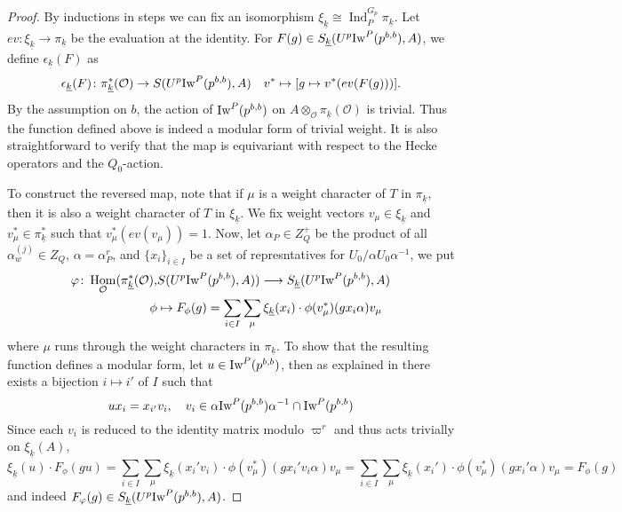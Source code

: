 \documentclass[leqno]{amsart}
\theoremstyle{definition}
\theoremstyle{remark}
\newcommand{\oo}{\mathcal{O}}
\DeclareMathOperator{\Hom}{Hom}
\DeclareMathOperator{\Ind}{Ind}
\newcommand{\wt}[1]{\underline{ #1 }}
\newcommand{\Iw}{\textnormal{Iw}} %
\begin{document}
\begin{proof}
	By inductions in steps
	we can fix an isomorphism 
	$\xi_{\wt{k}}\cong \Ind_{P}^{G_p}\pi_{\wt{k}}$.
	Let $ev\colon \xi_{\wt{k}}\to \pi_{\wt{k}}$
	be the evaluation at the identity.
	For $F(g)\in S_{\wt{k}}(U^p\Iw^P(p^{b,b}),A)$,
	we define 
	$\epsilon_{\wt{k}}(F)$ as 
	\begin{equation}\label{eq:wt_indep}
	\epsilon_{\wt{k}}(F)\colon 
	\pi^*_{\wt{k}}(\oo)\rightarrow
	S(U^p\Iw^P(p^{b,b}),A)\quad
	v^*\mapsto [g\mapsto v^*(ev(F(g)))].
	\end{equation}
	By the assumption on $b$,
	the action of $\Iw^P(p^{b,b})$ on 
	$A\otimes_{\oo}\pi_{\wt{k}}(\oo)$
	is trivial.
	Thus the function defined above is indeed 
	a modular form
	of trivial weight.
	It is also straightforward to verify
	that the map is equivariant with respect
	to the Hecke operators and the $Q_0$-action.


	To construct the reversed map,
	note that if $\mu$ is a weight character of $T$ in  
	$\pi_{\wt{k}}$, then it is also a weight character 
	of $T$ in $\xi_{\wt{k}}$.
	We fix weight vectors $v_\mu\in \xi_{\wt{k}}$
	and $v^*_\mu\in \pi_{\wt{k}}^*$
	such that $v^*_{\mu}(ev(v_\mu))=1$.
	Now, let $\alpha_P\in Z_Q^+$ be the product
	of all $\alpha_w^{(j)}\in Z_Q$, $\alpha=\alpha_P^r$,
	and $\{x_i\}_{i\in I}$
	be a set of represntatives 
	for $U_0/\alpha U_0\alpha^{-1}$,
	we put 
	\begin{align*}
		\varphi\colon 
		\Hom_{\oo}(\pi_{\wt{k}}^*(\oo),&
		S(U^p\Iw^P(p^{b,b}),A))\longrightarrow
		S_{\wt{k}}(U^p\Iw^P(p^{b,b}),A)\\
		\phi&\mapsto 
		F_\phi(g)=\sum_{i\in I} \sum_{\mu}
		\xi_{\wt{k}}(x_i)\cdot 
		\phi(v^*_\mu)(gx_i\alpha)v_\mu
	\end{align*}
	where $\mu$ runs through the weight characters in 
	$\pi_{\wt{k}}$.
	To show that the resulting function 
	defines a modular form,
	let $u\in \Iw^P(p^{b,b})$, 
	then as explained in \cite[Prop 2.22]{ger}
	there exists a bijection $i\mapsto i'$ of $I$
	such that 
	 \[
		ux_i=x_{i'}v_i,\quad
		v_i\in\alpha\Iw^P(p^{b,b})\alpha^{-1} 
		\cap \Iw^P(p^{b,b})
	\]
	Since each $v_i$ is reduced to the identity matrix 
	modulo $\varpi^r$ and thus acts trivially on 
	$\xi_{\wt{k}}(A)$,
	\[
		\xi_{\wt{k}}(u)\cdot F_\phi(gu)=
		\sum_{i\in I}\sum_{\mu}
		\xi_{\wt{k}}(x_i'v_i)\cdot 
		\phi(v^*_\mu)(gx_i'v_i\alpha)v_\mu=
		\sum_{i\in I}\sum_{\mu}
		\xi_{\wt{k}}(x_i')\cdot 
		\phi(v^*_\mu)(gx_i'\alpha)v_\mu=F_\phi(g)
	\]
	and indeed $F_\varphi(g)\in 
	S_{\wt{k}}(U^p\Iw^P(p^{b,b}),A)$.


\end{proof}
\end{document}
